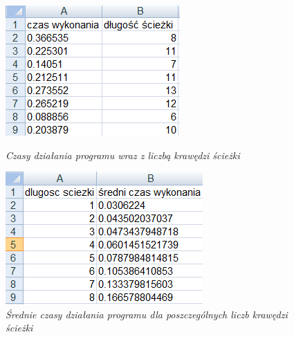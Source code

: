 \documentclass[a4paper, 12pt]{article}
\begin{document}
\begin{figure}[ht]
\begin{minipage}[b]{0.41\linewidth}
\centering
\includegraphics[width=\textwidth]{tabela1.png}
\caption{\em Czasy działania programu wraz z liczbą krawędzi ścieżki}
\label{fig:tabela1}
\end{minipage}
\hspace{0.5cm}
\begin{minipage}[b]{0.45\linewidth}
\centering
\includegraphics[width=\textwidth]{tabela2.png}
\caption{\em Średnie czasy działania programu dla poszczególnych liczb krawędzi ścieżki}
\label{fig:tabela2}
\end{minipage}
\end{figure}
\end{document}
